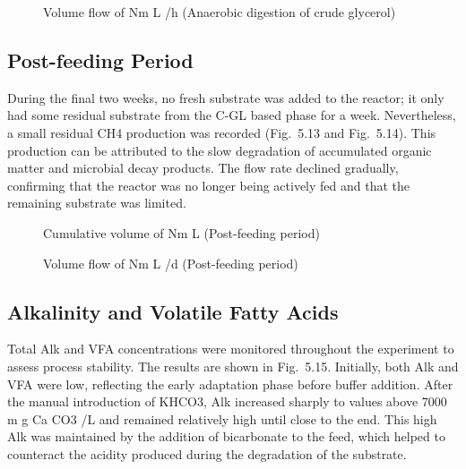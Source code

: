 \documentclass[12pt, a4paper, oneside]{report}
\begin{document}
\begin{figure}[H]
    \centering
    \caption{Volume flow of  Nm L /h (Anaerobic digestion of crude glycerol)}
    
\end{figure}

\subsection{Post-feeding Period}

During the final two weeks, no fresh substrate was added to the reactor; it only had some residual substrate from the C-GL based phase for a week. Nevertheless, a small residual CH4 production was recorded (Fig. 5.13 and Fig. 5.14). This production can be attributed to the slow degradation of accumulated organic matter and microbial decay products. The flow rate declined gradually, confirming that the reactor was no longer being actively fed and that the remaining substrate was limited.

\begin{figure}[H]
    \centering
    \caption{Cumulative volume of  Nm L (Post-feeding period)}
    
\end{figure}

\begin{figure}[H]
    \centering
    \caption{Volume flow of  Nm L /d (Post-feeding period)}
    
\end{figure}

\subsection{Alkalinity and Volatile Fatty Acids}

Total Alk and VFA concentrations were monitored throughout the experiment to assess process stability. The results are shown in Fig. 5.15. Initially, both Alk and VFA were low, reflecting the early adaptation phase before buffer addition. After the manual introduction of KHCO3, Alk increased sharply to values above 7000 m g Ca CO3 /L and remained relatively high until close to the end. This high Alk was maintained by the addition of bicarbonate to the feed, which helped to counteract the acidity produced during the degradation of the substrate.
\end{document}
